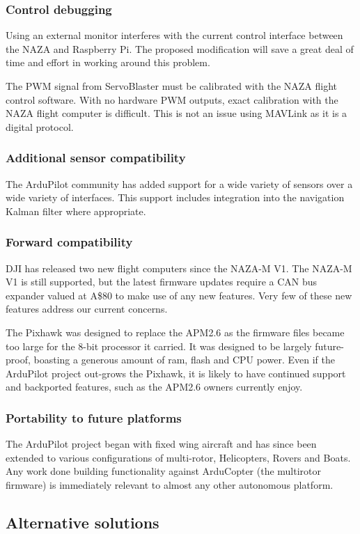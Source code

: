 \documentclass[a4paper, 11pt, titlepage]{article}
\begin{document}
\subsubsection{Control debugging}
Using an external monitor interferes with the current control interface between the NAZA and Raspberry Pi. The proposed modification will save a great deal of time and effort in working around this problem.

The PWM signal from ServoBlaster must be calibrated with the  NAZA flight control software. With no hardware PWM outputs, exact calibration with the NAZA flight computer is difficult. This is not an issue using MAVLink as it is a digital protocol. 

\subsubsection{Additional sensor compatibility}
The ArduPilot community has added support for a wide variety of sensors over a wide variety of interfaces. This support includes integration into the navigation Kalman filter where appropriate.
\subsubsection{Forward compatibility}
DJI has released two new flight computers since the NAZA-M V1.
The NAZA-M V1 is still supported, but the latest firmware updates require a CAN bus expander valued at A\$80 to make use of any new features.  Very few of these new features address our current concerns.

The Pixhawk was designed to replace the APM2.6 as the firmware files became too large for the 8-bit processor it carried.  It was designed to be largely future-proof, boasting a generous amount of ram, flash and CPU power.  Even if the ArduPilot project out-grows the Pixhawk, it is likely to have continued support and backported features, such as the APM2.6 owners currently enjoy.
\subsubsection{Portability to future platforms}
The ArduPilot project began with fixed wing aircraft and has since been extended to various configurations of multi-rotor, Helicopters, Rovers and Boats.
Any work done building functionality against ArduCopter (the multirotor firmware) is immediately relevant to almost any other autonomous platform.

\subsection{Alternative solutions}
\end{document}
